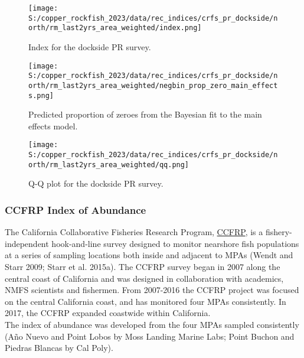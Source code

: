 \documentclass[11pt,
  english,
  letterpaper,
]{article}
\begin{document}
\newpage

\begin{figure}
\centering
\texttt{[image: S:/copper\_rockfish\_2023/data/rec\_indices/crfs\_pr\_dockside/north/rm\_last2yrs\_area\_weighted/index.png]}
\caption{Index for the dockside PR survey.\label{fig:pr-index}}
\end{figure}

\newpage

\begin{figure}
\centering
\texttt{[image: S:/copper\_rockfish\_2023/data/rec\_indices/crfs\_pr\_dockside/north/rm\_last2yrs\_area\_weighted/negbin\_prop\_zero\_main\_effects.png]}
\caption{Predicted proportion of zeroes from the Bayesian fit to the main effects model.\label{fig:pr-prop-zero}}
\end{figure}

\newpage

\begin{figure}
\centering
\texttt{[image: S:/copper\_rockfish\_2023/data/rec\_indices/crfs\_pr\_dockside/north/rm\_last2yrs\_area\_weighted/qq.png]}
\caption{Q-Q plot for the dockside PR survey.\label{fig:pr-qq}}
\end{figure}

\newpage

\hypertarget{ccfrp-index}{%
\subsubsection{CCFRP Index of Abundance}\label{ccfrp-index}}

The California Collaborative Fisheries Research Program, \href{https://www.mlml.calstate.edu/ccfrp/}{CCFRP}, is a fishery-independent hook-and-line survey designed to monitor nearshore fish populations at a series of sampling locations both inside and adjacent to MPAs (Wendt and Starr 2009; Starr et al. 2015a). The CCFRP survey began in 2007 along the central coast of California and was designed in collaboration with academics, NMFS scientists and fishermen. From 2007-2016 the CCFRP project was focused on the central California coast, and has monitored four MPAs consistently. In 2017, the CCFRP expanded coastwide within California.\\
The index of abundance was developed from the four MPAs sampled consistently (Año Nuevo and Point Lobos by Moss Landing Marine Labs; Point Buchon and Piedras Blancas by Cal Poly).
\end{document}
